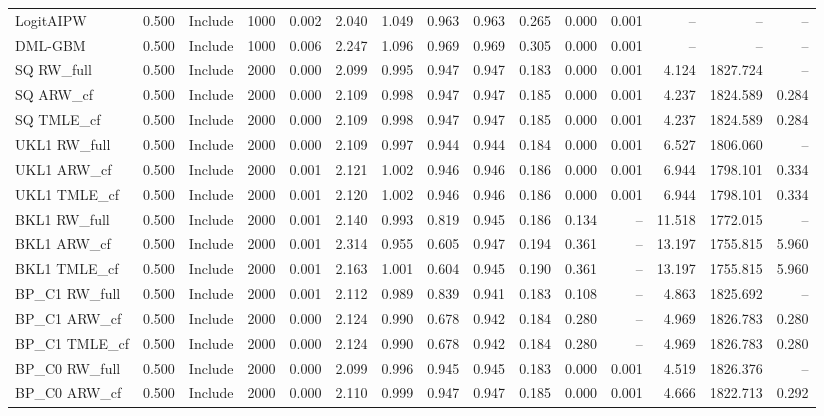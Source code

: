 \begin{tabular}{llllrrrrrrrrrrr}
LogitAIPW & 0.500 & Include & 1000 & 0.002 & 2.040 & 1.049 & 0.963 & 0.963 & 0.265 & 0.000 & 0.001 & -- & -- & -- \\
DML-GBM & 0.500 & Include & 1000 & 0.006 & 2.247 & 1.096 & 0.969 & 0.969 & 0.305 & 0.000 & 0.001 & -- & -- & -- \\
SQ RW\_full & 0.500 & Include & 2000 & 0.000 & 2.099 & 0.995 & 0.947 & 0.947 & 0.183 & 0.000 & 0.001 & 4.124 & 1827.724 & -- \\
SQ ARW\_cf & 0.500 & Include & 2000 & 0.000 & 2.109 & 0.998 & 0.947 & 0.947 & 0.185 & 0.000 & 0.001 & 4.237 & 1824.589 & 0.284 \\
SQ TMLE\_cf & 0.500 & Include & 2000 & 0.000 & 2.109 & 0.998 & 0.947 & 0.947 & 0.185 & 0.000 & 0.001 & 4.237 & 1824.589 & 0.284 \\
UKL1 RW\_full & 0.500 & Include & 2000 & 0.000 & 2.109 & 0.997 & 0.944 & 0.944 & 0.184 & 0.000 & 0.001 & 6.527 & 1806.060 & -- \\
UKL1 ARW\_cf & 0.500 & Include & 2000 & 0.001 & 2.121 & 1.002 & 0.946 & 0.946 & 0.186 & 0.000 & 0.001 & 6.944 & 1798.101 & 0.334 \\
UKL1 TMLE\_cf & 0.500 & Include & 2000 & 0.001 & 2.120 & 1.002 & 0.946 & 0.946 & 0.186 & 0.000 & 0.001 & 6.944 & 1798.101 & 0.334 \\
BKL1 RW\_full & 0.500 & Include & 2000 & 0.001 & 2.140 & 0.993 & 0.819 & 0.945 & 0.186 & 0.134 & -- & 11.518 & 1772.015 & -- \\
BKL1 ARW\_cf & 0.500 & Include & 2000 & 0.001 & 2.314 & 0.955 & 0.605 & 0.947 & 0.194 & 0.361 & -- & 13.197 & 1755.815 & 5.960 \\
BKL1 TMLE\_cf & 0.500 & Include & 2000 & 0.001 & 2.163 & 1.001 & 0.604 & 0.945 & 0.190 & 0.361 & -- & 13.197 & 1755.815 & 5.960 \\
BP\_C1 RW\_full & 0.500 & Include & 2000 & 0.001 & 2.112 & 0.989 & 0.839 & 0.941 & 0.183 & 0.108 & -- & 4.863 & 1825.692 & -- \\
BP\_C1 ARW\_cf & 0.500 & Include & 2000 & 0.000 & 2.124 & 0.990 & 0.678 & 0.942 & 0.184 & 0.280 & -- & 4.969 & 1826.783 & 0.280 \\
BP\_C1 TMLE\_cf & 0.500 & Include & 2000 & 0.000 & 2.124 & 0.990 & 0.678 & 0.942 & 0.184 & 0.280 & -- & 4.969 & 1826.783 & 0.280 \\
BP\_C0 RW\_full & 0.500 & Include & 2000 & 0.000 & 2.099 & 0.996 & 0.945 & 0.945 & 0.183 & 0.000 & 0.001 & 4.519 & 1826.376 & -- \\
BP\_C0 ARW\_cf & 0.500 & Include & 2000 & 0.000 & 2.110 & 0.999 & 0.947 & 0.947 & 0.185 & 0.000 & 0.001 & 4.666 & 1822.713 & 0.292 \\

\end{tabular}
